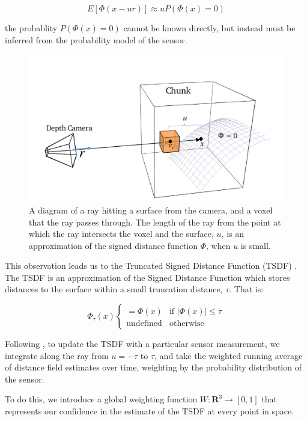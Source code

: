 \documentclass[conference,10pt]{IEEEtran}
\begin{document}
$$ E[\Phi(x - ur)] \approx u P(\Phi(x) = 0) $$

\noindent the probablity $P(\Phi(x) = 0)$ cannot be known directly, but instead
must be inferred from the probability model of the sensor.

\begin{figure}[t]
  \centering
    \includegraphics[width=1.0\columnwidth]{img/Raycast}
      \caption{A diagram of a ray hitting a surface from the camera, and a
      voxel that the ray passes through. The length of the ray from the point at
      which the ray intersects the voxel and the surface, $u$, is an
      approximation of the signed distance function $\Phi$, when $u$ is small.}
  \label{fig:raycast_diagram}
\end{figure}


This observation leads us to the Truncated Signed Distance Function (TSDF)
\cite{Curless1996}. The TSDF is an approximation of the  Signed Distance
Function which stores distances to the surface within a small truncation
distance, $\tau$. That is:

$$ \Phi_{\tau}(x) \begin{cases}
	 = \Phi(x) & \text{if } |\Phi(x)| \leq \tau \\
	 \text{undefined} & \text{otherwise}
	 \end{cases}
$$

Following \cite{Curless1996}, to update the TSDF with a particular sensor
measurement, we integrate along the ray from $u = -\tau$ to $\tau$, and take the
weighted running average of distance field estimates over time, weighting by the
probability distribution of the sensor.

To do this, we introduce a global weighting function $W : \mathbf{R}^3 \to [0,
1]$ that represents our confidence in the estimate of the TSDF at every point in
space.
\end{document}
